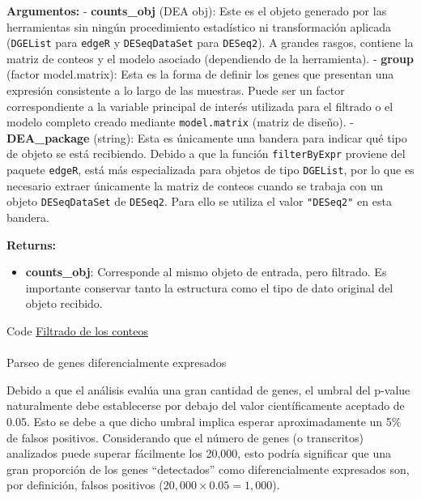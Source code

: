\documentclass[
  9pt,
]{article}
\makeatletter
\let\oldparagraph\paragraph
\renewcommand{\paragraph}{
    \@ifstar
      \xxxParagraphStar
      \xxxParagraphNoStar
  }
\newcommand{\xxxParagraphStar}[1]{\oldparagraph*{#1}\mbox{}}
\newcommand{\xxxParagraphNoStar}[1]{\oldparagraph{#1}\mbox{}}
\providecommand{\tightlist}{%
  \setlength{\itemsep}{0pt}\setlength{\parskip}{0pt}}
\makeatother
\begin{document}
\textbf{Argumentos:} - \textbf{counts\_obj} (DEA obj): Este es el objeto
generado por las herramientas sin ningún procedimiento estadístico ni
transformación aplicada (\texttt{DGEList} para \texttt{edgeR} y
\texttt{DESeqDataSet} para \texttt{DESeq2}). A grandes rasgos, contiene
la matriz de conteos y el modelo asociado (dependiendo de la
herramienta). - \textbf{group} (factor \textbar{} model.matrix): Esta es
la forma de definir los genes que presentan una expresión consistente a
lo largo de las muestras. Puede ser un factor correspondiente a la
variable principal de interés utilizada para el filtrado o el modelo
completo creado mediante \texttt{model.matrix} (matriz de diseño). -
\textbf{DEA\_package} (string): Esta es únicamente una bandera para
indicar qué tipo de objeto se está recibiendo. Debido a que la función
\texttt{filterByExpr} proviene del paquete \texttt{edgeR}, está más
especializada para objetos de tipo \texttt{DGEList}, por lo que es
necesario extraer únicamente la matriz de conteos cuando se trabaja con
un objeto \texttt{DESeqDataSet} de \texttt{DESeq2}. Para ello se utiliza
el valor \texttt{"DESeq2"} en esta bandera.

\textbf{Returns:}

\begin{itemize}
\tightlist
\item
  \textbf{counts\_obj}: Corresponde al mismo objeto de entrada, pero
  filtrado. Es importante conservar tanto la estructura como el tipo de
  dato original del objeto recibido.
\end{itemize}

Code \hyperref[filt_func]{Filtrado de los conteos}

\paragraph{Parseo de genes diferencialmente
expresados}\label{parseo-de-genes-diferencialmente-expresados}

Debido a que el análisis evalúa una gran cantidad de genes, el umbral
del p-value naturalmente debe establecerse por debajo del valor
científicamente aceptado de 0.05. Esto se debe a que dicho umbral
implica esperar aproximadamente un 5\% de falsos positivos. Considerando
que el número de genes (o transcritos) analizados puede superar
fácilmente los 20,000, esto podría significar que una gran proporción de
los genes ``detectados'' como diferencialmente expresados son, por
definición, falsos positivos (\(20,000 \times 0.05 = 1,000\)).
\end{document}
